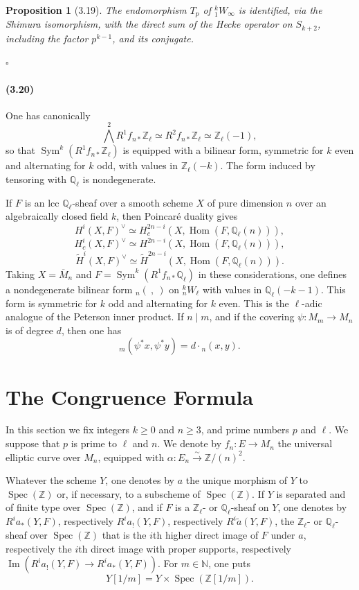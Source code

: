 \documentclass[10pt]{article}
\newcommand{\Q}{\mathbb Q}
\newcommand{\Z}{\mathbb Z}
\newcommand{\Hom}{\operatorname{Hom}}
\newcommand{\Spec}{\operatorname{Spec}}
\newcommand{\Sym}{\operatorname{Sym}}
\newcommand{\Imop}{\operatorname{Im}}
\newcommand{\QED}{\hfill$\square$}
\newtheorem*{proposition}{Proposition}
\begin{document}
\begin{proposition}[3.19]
The endomorphism $T_p$ of ${}^k_1W_\infty$ is identified, via the Shimura isomorphism, with the direct sum of the Hecke operator on $S_{k+2}$, including the factor $p^{k-1}$, and its conjugate.
\end{proposition}
\QED

\paragraph{(3.20)}
One has canonically
\[
\bigwedge^2 R^1f_{n*}\Z_\ell\simeq R^2f_{n*}\Z_\ell\simeq \Z_\ell(-1),
\]
so that $\Sym^k(R^1f_{n*}\Z_\ell)$ is equipped with a bilinear form, symmetric for $k$ even and alternating for $k$ odd, with values in $\Z_\ell(-k)$. The form induced by tensoring with $\Q_\ell$ is nondegenerate.

If $F$ is an lcc $\Q_\ell$-sheaf over a smooth scheme $X$ of pure dimension $n$ over an algebraically closed field $k$, then Poincaré duality gives
\[
H^i(X,F)^\vee\simeq H_c^{2n-i}(X,\Hom(F,\Q_\ell(n))),
\]
\[
H_c^i(X,F)^\vee\simeq H^{2n-i}(X,\Hom(F,\Q_\ell(n))),
\]
\[
\widetilde H^i(X,F)^\vee\simeq \widetilde H^{2n-i}(X,\Hom(F,\Q_\ell(n))).
\]
Taking $X=\overline M_n$ and $F=\Sym^k(R^1f_{n*}\Q_\ell)$ in these considerations, one defines a nondegenerate bilinear form ${}_n(\ ,\ )$ on ${}^k_nW_\ell$ with values in $\Q_\ell(-k-1)$. This form is symmetric for $k$ odd and alternating for $k$ even. This is the $\ell$-adic analogue of the Peterson inner product. If $n\mid m$, and if the covering $\psi:M_m\to M_n$ is of degree $d$, then one has
\[
{}_m(\psi^*x,\psi^*y)=d\cdot {}_n(x,y).
\]

\section{The Congruence Formula}

In this section we fix integers $k\geq 0$ and $n\geq 3$, and prime numbers $p$ and $\ell$. We suppose that $p$ is prime to $\ell$ and $n$. We denote by $f_n:E\to M_n$ the universal elliptic curve over $M_n$, equipped with $\alpha:E_n\xrightarrow{\sim}\Z/(n)^2$.

Whatever the scheme $Y$, one denotes by $a$ the unique morphism of $Y$ to $\Spec(\Z)$ or, if necessary, to a subscheme of $\Spec(\Z)$. If $Y$ is separated and of finite type over $\Spec(\Z)$, and if $F$ is a $\Z_\ell$- or $\Q_\ell$-sheaf on $Y$, one denotes by $R^ia_*(Y,F)$, respectively $R^ia_!(Y,F)$, respectively $R^i\widetilde a(Y,F)$, the $\Z_\ell$- or $\Q_\ell$-sheaf over $\Spec(\Z)$ that is the $i$th higher direct image of $F$ under $a$, respectively the $i$th direct image with proper supports, respectively $\Imop(R^ia_!(Y,F)\to R^ia_*(Y,F))$. For $m\in\mathbb N$, one puts
\[
Y[1/m]=Y\times\Spec(\Z[1/m]).
\]
\end{document}
